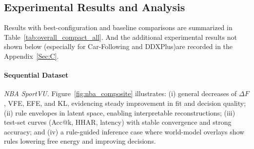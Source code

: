 \documentclass{article} %
\begin{document}



\subsection{Experimental Results and Analysis}
Results with best-configuration and baseline comparisons are summarized in Table~\ref{tab:overall_compact_all}. And the additional experimental results not shown below (especially for Car-Following and DDXPlus)are recorded in the Appendix~\ref{Sec:C}.

\paragraph{Sequential Dataset}

\textit{NBA SportVU.}
Figure~\ref{fig:nba_composite} illustrates: (i) general decreases of $\Delta F$, VFE, EFE, and KL, evidencing steady improvement in fit and decision quality; (ii) rule envelopes in latent space, enabling interpretable reconstructions; (iii) test-set curves (Acc@k, HHAR, latency) with stable convergence and strong accuracy; and (iv) a rule-guided inference case where 
world-model overlays show rules lowering free energy and improving decisions.
\end{document}
